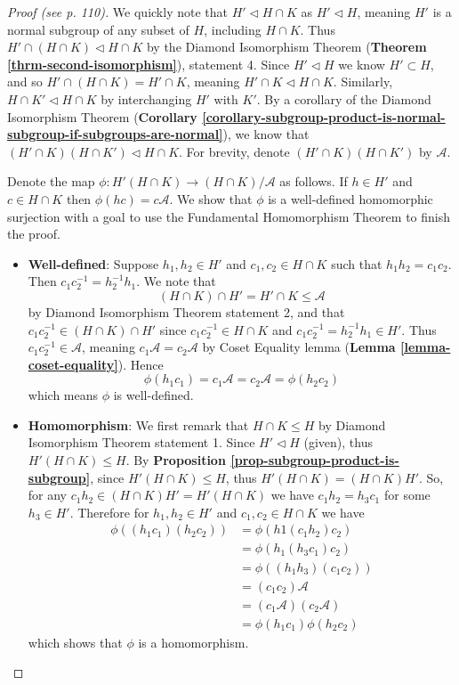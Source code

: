 \begin{proof}[Proof (see \cite{hungerford_1980} p. 110)]
    We quickly note that $H' \lhd H \cap K$ as $H' \lhd H$, meaning $H'$ is a normal subgroup of any subset of $H$, including $H \cap K$. Thus $H' \cap (H \cap K) \lhd H \cap K$ by the Diamond Isomorphism Theorem (\textbf{Theorem \ref{thrm-second-isomorphism}}), statement 4. Since $H'\lhd H$ we know $H' \subset H$, and so $H' \cap (H \cap K) = H' \cap K$, meaning $H' \cap K \lhd H \cap K$. Similarly, $H \cap K' \lhd H \cap K$ by interchanging $H'$ with $K'$. By a corollary of the Diamond Isomorphism Theorem (\textbf{Corollary \ref{corollary-subgroup-product-is-normal-subgroup-if-subgroups-are-normal}}), we know that $(H' \cap K)(H \cap K') \lhd H \cap K$. For brevity, denote $(H' \cap K)(H \cap K')$ by $\mathcal{A}$.
    
    Denote the map $\phi: H'(H\cap K) \to (H\cap K)/\mathcal{A}$ as follows. If $h \in H'$ and $c \in H \cap K$ then $\phi(hc) = c\mathcal{A}$. We show that $\phi$ is a well-defined homomorphic surjection with a goal to use the Fundamental Homomorphism Theorem to finish the proof.
    
    \begin{itemize}
        \item \textbf{Well-defined}: Suppose $h_1, h_2 \in H'$ and $c_1, c_2 \in H \cap K$ such that $h_1h_2 = c_1c_2$. Then $c_1c_2^{-1} = h_2^{-1}h_1$. We note that
        \[
            (H \cap K) \cap H' = H' \cap K \leq \mathcal{A}    
        \]
        by Diamond Isomorphism Theorem statement 2, and that $c_1c_2^{-1} \in (H \cap K) \cap H'$ since $c_1c_2^{-1} \in H \cap K$ and $c_1c_2^{-1} = h_2^{-1}h_1 \in H'$. Thus $c_1c_2^{-1} \in \mathcal{A}$, meaning $c_1\mathcal{A} = c_2\mathcal{A}$ by Coset Equality lemma (\textbf{Lemma \ref{lemma-coset-equality}}). Hence
        \[
            \phi(h_1c_1) = c_1\mathcal{A} = c_2\mathcal{A} = \phi(h_2c_2)        
        \]
        which means $\phi$ is well-defined.
        
        \item \textbf{Homomorphism}: We first remark that $H \cap K \leq H$ by Diamond Isomorphism Theorem statement 1. Since $H' \lhd H$ (given), thus $H'(H\cap K) \leq H$. By \textbf{Proposition \ref{prop-subgroup-product-is-subgroup}}, since $H'(H\cap K) \leq H$, thus $H'(H\cap K) = (H\cap K)H'$. So, for any $c_1h_2 \in (H\cap K)H' = H'(H\cap K)$ we have $c_1h_2 = h_3c_1$ for some $h_3 \in H'$. Therefore for $h_1, h_2 \in H'$ and $c_1, c_2 \in H \cap K$ we have
        \begin{align*}
            \phi((h_1c_1)(h_2c_2)) &= \phi(h1(c_1h_2)c_2)\\
            &=\phi(h_1(h_3c_1)c_2)\\
            &=\phi((h_1h_3)(c_1c_2))\\
            &=(c_1c_2)\mathcal{A}\\
            &=(c_1\mathcal{A})(c_2\mathcal{A})\\
            &=\phi(h_1c_1)\phi(h_2c_2)
        \end{align*}
        which shows that $\phi$ is a homomorphism.
        

\end{itemize}
\end{proof}

